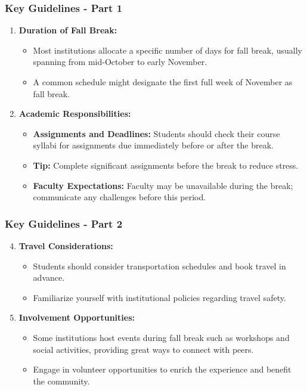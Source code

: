 \documentclass[aspectratio=169]{beamer}
\begin{document}
\begin{frame}[fragile]
    \frametitle{Key Guidelines - Part 1}

    \begin{enumerate}
        \item \textbf{Duration of Fall Break:}
        \begin{itemize}
            \item Most institutions allocate a specific number of days for fall break, usually spanning from mid-October to early November.
            \item A common schedule might designate the first full week of November as fall break.
        \end{itemize}

        \item \textbf{Academic Responsibilities:}
        \begin{itemize}
            \item \textbf{Assignments and Deadlines:} Students should check their course syllabi for assignments due immediately before or after the break.
            \item \textbf{Tip:} Complete significant assignments before the break to reduce stress.
            \item \textbf{Faculty Expectations:} Faculty may be unavailable during the break; communicate any challenges before this period.
        \end{itemize}
    \end{enumerate}
\end{frame}

\begin{frame}[fragile]
    \frametitle{Key Guidelines - Part 2}

    \begin{enumerate}
        \setcounter{enumi}{3} %
        \item \textbf{Travel Considerations:}
        \begin{itemize}
            \item Students should consider transportation schedules and book travel in advance.
            \item Familiarize yourself with institutional policies regarding travel safety.
        \end{itemize}

        \item \textbf{Involvement Opportunities:}
        \begin{itemize}
            \item Some institutions host events during fall break such as workshops and social activities, providing great ways to connect with peers.
            \item Engage in volunteer opportunities to enrich the experience and benefit the community.
        \end{itemize}
    \end{enumerate}
\end{frame}
\end{document}
